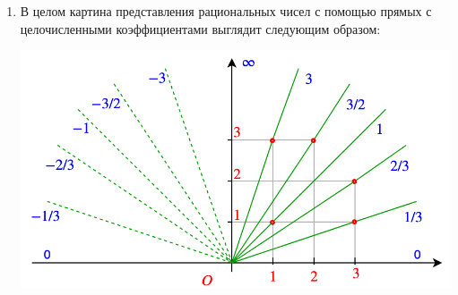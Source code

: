 \begin{enumerate}
\item В целом картина представления рациональных чисел с помощью прямых с целочисленными коэффициентами выглядит следующим образом:
\begin{center}
\includegraphics[scale=0.4]{ratio.png}
\end{center}


\end{enumerate}

